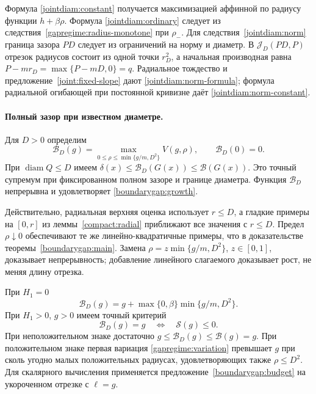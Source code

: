 Формула \eqref{jointdiam:constant} получается максимизацией
аффинной по радиусу функции $h+\beta\rho$.
Формула \eqref{jointdiam:ordinary} следует из
следствия~\ref{gapregime:radius-monotone} при $\rho_-$.
Для следствия~\ref{jointdiam:norm} граница зазора $PD$
следует из ограничений на норму и диаметр.
В $\mathcal J_D(PD,P)$ отрезок радиусов состоит из одной
точки $r_D^2$, а начальная производная равна
$P-mr_D=\max\{P-mD,0\}=q$.
Радиальное тождество и предложение~\ref{joint:fixed-slope}
дают \eqref{jointdiam:norm-formula}; формула радиальной
огибающей при постоянной кривизне даёт
\eqref{jointdiam:norm-constant}.

\paragraph{Полный зазор при известном диаметре.}
Для $D>0$ определим
\begin{equation}\label{compact:gap-diameter}
 \mathcal B_D(g)=
 \max_{0\le\rho\le\min\{g/m,D^2\}}V(g,\rho),\qquad
 \mathcal B_D(0)=0.
\end{equation}
При $\operatorname{diam}Q\le D$ имеем
$\delta(x)\le\mathcal B_D(G(x))\le\mathcal B(G(x))$.
Это точный супремум при фиксированном полном зазоре и границе
диаметра. Функция $\mathcal B_D$ непрерывна и удовлетворяет
\eqref{boundarygap:growth}.

Действительно, радиальная верхняя оценка использует $r\le D$,
а гладкие примеры на $[0,r]$ из леммы~\ref{compact:radial}
приближают все значения с $r\le D$.
Предел $\rho\downarrow0$ обеспечивают те же линейно-квадратичные
примеры, что в доказательстве теоремы~\ref{boundarygap:main}.
Замена $\rho=z\min\{g/m,D^2\}$, $z\in[0,1]$, доказывает
непрерывность; добавление линейного слагаемого доказывает рост,
не меняя длину отрезка.

При $H_1=0$
\[
 \mathcal B_D(g)=g+\max\{0,\beta\}\min\{g/m,D^2\}.
\]
При $H_1>0$, $g>0$ имеем точный критерий
\[
 \mathcal B_D(g)=g\quad\Longleftrightarrow\quad\mathcal S(g)\le0.
\]
При неположительном знаке достаточно
$g\le\mathcal B_D(g)\le\mathcal B(g)=g$.
При положительном знаке первая вариация
\eqref{gapregime:variation} превышает $g$ при сколь угодно
малых положительных радиусах, удовлетворяющих также $\rho\le D^2$.
Для скалярного вычисления применяется предложение~\ref{boundarygap:budget}
на укороченном отрезке с $\ell=g$.
